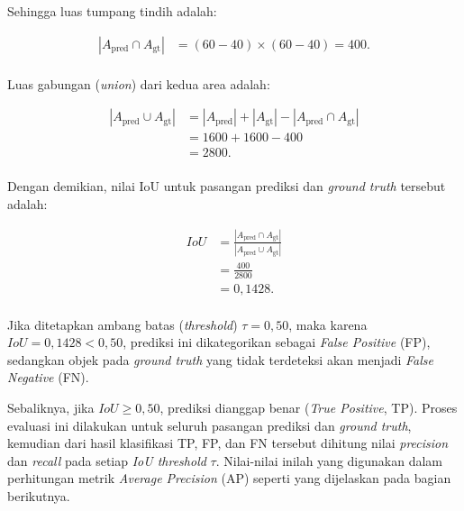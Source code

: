 Sehingga luas tumpang tindih adalah:

\medskip
\begin{align*}
    |A_{\text{pred}} \cap A_{\text{gt}}| 
    &= (60 - 40) \times (60 - 40) = 400. \\[0.5em]
\end{align*}

Luas gabungan (\textit{union}) dari kedua area adalah:

\medskip
\begin{align*}
    |A_{\text{pred}} \cup A_{\text{gt}}|
    &= |A_{\text{pred}}| + |A_{\text{gt}}| - |A_{\text{pred}} \cap A_{\text{gt}}| \\[0.5em]
     &= 1600 + 1600 - 400 \\[0.5em]
     &= 2800. \\[0.5em]
\end{align*}

Dengan demikian, nilai IoU untuk pasangan prediksi dan \textit{ground truth} tersebut adalah:

\medskip
\begin{align*}
    IoU &= \frac{|A_{\text{pred}} \cap A_{\text{gt}}|}{|A_{\text{pred}} \cup A_{\text{gt}}|} \\[0.5em]
     &= \frac{400}{2800} \\[0.5em]
     &= 0{,}1428. \\[0.5em]
\end{align*}

Jika ditetapkan ambang batas (\textit{threshold}) $\tau = 0{,}50$, maka karena $IoU = 0{,}1428 < 0{,}50$, prediksi ini dikategorikan sebagai \textit{False Positive} (FP), sedangkan objek pada \textit{ground truth} yang tidak terdeteksi akan menjadi \textit{False Negative} (FN).

Sebaliknya, jika $IoU \geq 0{,}50$, prediksi dianggap benar (\textit{True Positive}, TP).
Proses evaluasi ini dilakukan untuk seluruh pasangan prediksi dan \textit{ground truth}, kemudian dari hasil klasifikasi TP, FP, dan FN tersebut dihitung nilai \textit{precision} dan \textit{recall} pada setiap \textit{IoU threshold} $\tau$. Nilai-nilai inilah yang digunakan dalam perhitungan metrik \textit{Average Precision} (AP) seperti yang dijelaskan pada bagian berikutnya.
